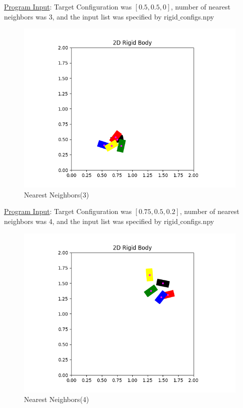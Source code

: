 \documentclass{article}
\begin{document}
\underline{Program Input}: Target Configuration was $[0.5, 0.5, 0]$, number of nearest neighbors was 3, and the input list was specified by rigid$\_$configs.npy

\newpage 
\begin{figure}[h!]
	\includegraphics[width= 0.9 \linewidth]{P2_NearestNeighbor(3).png}
	\centering
	\caption{Nearest Neighbors(3)}
	\label{P2_NearestNeighbor(3).png}
\end{figure}

\underline{Program Input}: Target Configuration was $[0.75, 0.5, 0.2]$, number of nearest neighbors was 4, and the input list was specified by rigid$\_$configs.npy

\newpage 
\begin{figure}[h!]
	\includegraphics[width= 0.9 \linewidth]{P2_NearestNeighbor(4).png}
	\centering
	\caption{Nearest Neighbors(4)}
	\label{P2_NearestNeighbor(4).png}
\end{figure}
\end{document}
